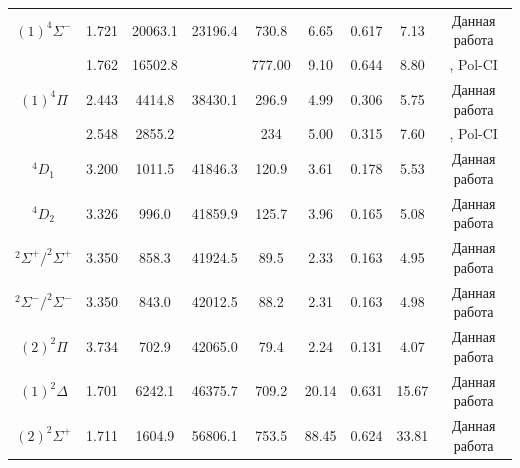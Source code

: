 \documentclass[12pt]{extarticle}
\begin{document}
\begin{table}[H]
\begin{tabular}{|c|c|c|c|c|c|c|c|c|}
    		$(1)^4\Sigma^-$         & 1.721            & 20063.1          & 23196.4          & 730.8                 & 6.65                      & 0.617            & 7.13                  & Данная работа                  \\
    		& 1.762            & 16502.8          &                  & 777.00                & 9.10                      & 0.644            & 8.80                  & \cite{hillier}, Pol-CI       \\ \hline
    		$(1)^4\Pi$              & 2.443            & 4414.8           & 38430.1          & 296.9                 & 4.99                      & 0.306            & 5.75                  & Данная работа                  \\
    		& 2.548            & 2855.2           &                  & 234                   & 5.00                      & 0.315            & 7.60                  & \cite{hillier}, Pol-CI       \\ \hline
    		$^4D_1$                 & 3.200            & 1011.5           & 41846.3          & 120.9                 & 3.61                      & 0.178            & 5.53                  & Данная работа                  \\
    		$^4D_2$                 & 3.326            & 996.0            & 41859.9          & 125.7                 & 3.96                      & 0.165            & 5.08                  & Данная работа                  \\
    		$^2\Sigma^+/^2\Sigma^+$ & 3.350            & 858.3            & 41924.5          & 89.5                  & 2.33                      & 0.163            & 4.95                  & Данная работа                  \\
    		$^2\Sigma^-/^2\Sigma^-$ & 3.350            & 843.0            & 42012.5          & 88.2                  & 2.31                      & 0.163            & 4.98                  & Данная работа                  \\
    		$(2)^2 \Pi$             & 3.734            & 702.9            & 42065.0          & 79.4                  & 2.24                      & 0.131            & 4.07                  & Данная работа                  \\
    		$(1)^2\Delta$           & 1.701            & 6242.1           & 46375.7          & 709.2                 & 20.14                     & 0.631            & 15.67                 & Данная работа                  \\
    		$(2)^2\Sigma^+$         & 1.711            & 1604.9           & 56806.1          & 753.5                 & 88.45                     & 0.624            & 33.81                 & Данная работа                  \\ \hline
    	\end{tabular}
    \end{table}
    
\end{document}
